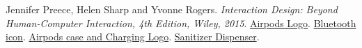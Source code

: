 \documentclass[10pt]{scrartcl}
\begin{document}
\begin{thebibliography}{widest entry}
Jennifer Preece, Helen Sharp and Yvonne Rogers.
\textit{Interaction Design: Beyond Human-Computer Interaction, 4th Edition, Wiley, 2015}.	
\href{https://bit.ly/2K8z2qN}{Airpods Logo}.
\href{https://bit.ly/32KegEc}{Bluetooth icon}.
\href{www.apple.com}{Airpods case and Charging Logo}.
\href{https://www.wec-group.com/hand-sanitiser-dispenser.html}{Sanitizer Dispenser}.
\end{thebibliography}
\end{document}
